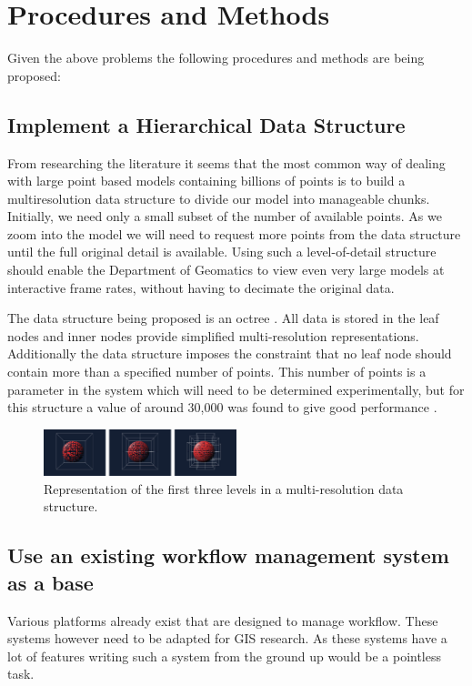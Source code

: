 \documentclass[12pt,a4paper]{article}
\begin{document}
\section{Procedures and Methods}
Given the above problems the following procedures and methods are being proposed:
\subsection{Implement a Hierarchical Data Structure}
From researching the literature it seems that the most common way of dealing
with large point based models containing billions of points is to build a
multiresolution data structure to divide our model into manageable chunks.
Initially, we need only a small subset of the number of available points.
As we zoom into the model we will need to request more points from the
data structure until the full original detail is available. Using such a
level-of-detail structure should enable the Department of Geomatics to
view even very large models at interactive frame rates, without having
to decimate the original data.

The data structure being proposed is an octree \cite{interactivepointclouds}. All
data is stored in the leaf nodes and inner nodes provide simplified multi-resolution
representations. Additionally the data structure imposes the constraint that no leaf
node should contain more than a specified number of points. This number of points is
a parameter in the system which will need to be determined experimentally, but for
this structure a value of around 30,000 was found to give good performance
\cite{interactivepointclouds}.
\begin{figure}[h!]
\centering
    \includegraphics[width=0.5\textwidth]{oct.png}
    \caption{Representation of the first three levels in a multi-resolution data structure.}
\end{figure}

\subsection{Use an existing workflow management system as a base}
Various platforms already exist that are designed to manage workflow. These
systems however need to be adapted for GIS research. As these systems have a lot of
features writing such a system from the ground up would be a pointless task. 
\end{document}
